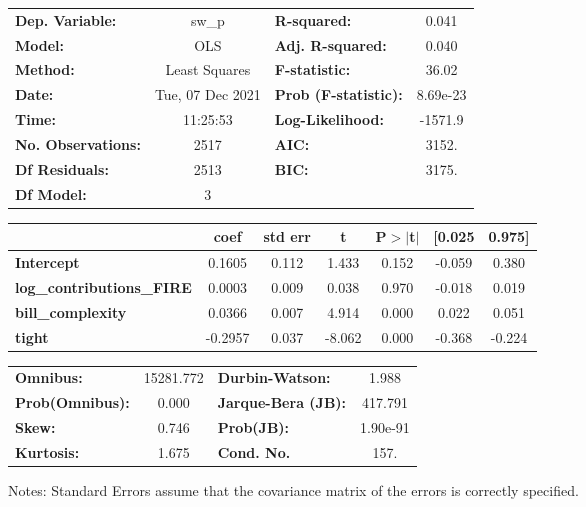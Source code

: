 \begin{center}
\begin{tabular}{lclc}
\toprule
\textbf{Dep. Variable:}           &      sw\_p       & \textbf{  R-squared:         } &     0.041   \\
\textbf{Model:}                   &       OLS        & \textbf{  Adj. R-squared:    } &     0.040   \\
\textbf{Method:}                  &  Least Squares   & \textbf{  F-statistic:       } &     36.02   \\
\textbf{Date:}                    & Tue, 07 Dec 2021 & \textbf{  Prob (F-statistic):} &  8.69e-23   \\
\textbf{Time:}                    &     11:25:53     & \textbf{  Log-Likelihood:    } &   -1571.9   \\
\textbf{No. Observations:}        &        2517      & \textbf{  AIC:               } &     3152.   \\
\textbf{Df Residuals:}            &        2513      & \textbf{  BIC:               } &     3175.   \\
\textbf{Df Model:}                &           3      & \textbf{                     } &             \\
\bottomrule
\end{tabular}
\begin{tabular}{lcccccc}
                                  & \textbf{coef} & \textbf{std err} & \textbf{t} & \textbf{P$> |$t$|$} & \textbf{[0.025} & \textbf{0.975]}  \\
\midrule
\textbf{Intercept}                &       0.1605  &        0.112     &     1.433  &         0.152        &       -0.059    &        0.380     \\
\textbf{log\_contributions\_FIRE} &       0.0003  &        0.009     &     0.038  &         0.970        &       -0.018    &        0.019     \\
\textbf{bill\_complexity}         &       0.0366  &        0.007     &     4.914  &         0.000        &        0.022    &        0.051     \\
\textbf{tight}                    &      -0.2957  &        0.037     &    -8.062  &         0.000        &       -0.368    &       -0.224     \\
\bottomrule
\end{tabular}
\begin{tabular}{lclc}
\textbf{Omnibus:}       & 15281.772 & \textbf{  Durbin-Watson:     } &    1.988  \\
\textbf{Prob(Omnibus):} &    0.000  & \textbf{  Jarque-Bera (JB):  } &  417.791  \\
\textbf{Skew:}          &    0.746  & \textbf{  Prob(JB):          } & 1.90e-91  \\
\textbf{Kurtosis:}      &    1.675  & \textbf{  Cond. No.          } &     157.  \\
\bottomrule
\end{tabular}
\end{center}

Notes: \newline
 [1] Standard Errors assume that the covariance matrix of the errors is correctly specified.
